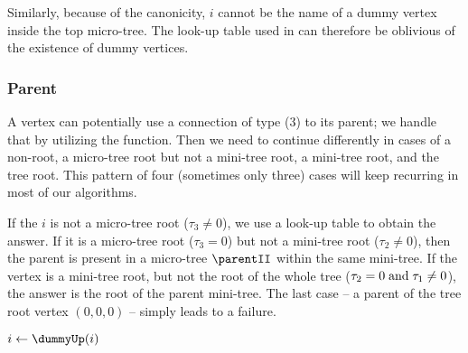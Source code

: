 Similarly, because of the canonicity, $i$ cannot be the name of a dummy vertex inside the top micro-tree.
The \degree{} look-up table used in \isLeaf{} can therefore be oblivious of the existence of dummy vertices.

\begin{algorithm}
\begin{algorithmic}
	\State {}
\EndFunction
\end{algorithmic}
\end{algorithm}

\begin{algorithm}
\begin{algorithmic}
	\State {}
\EndFunction
\end{algorithmic}
\end{algorithm}

\subsubsection{Parent}

A vertex can potentially use a connection of type (3) to its parent; we handle that by utilizing the \dummyUp{} function.
Then we need to continue differently in cases of a non-root, a micro-tree root but not a mini-tree root, a mini-tree root, and the tree root.
This pattern of four (sometimes only three) cases will keep recurring in most of our algorithms.

If the $i$ is not a micro-tree root ($\tau_3 \ne 0$), we use a look-up table to obtain the answer.
If it is a micro-tree root ($\tau_3 = 0$) but not a mini-tree root ($\tau_2 \ne 0$), then the parent is present in a micro-tree $\parentII$ within the same mini-tree.
If the vertex is a mini-tree root, but not the root of the whole tree ($\tau_2 = 0 \mathrel{\textrm{and}} \tau_1 \ne 0$), the answer is the root of the parent mini-tree.
The last case -- a parent of the tree root vertex $(0, 0, 0)$ -- simply leads to a failure.

\begin{algorithm}
\begin{algorithmic}
	\State $i \gets \dummyUp(i)$ 
	 
		\State {} 
	 
		\State {} 
	 
		\State {}
	\Else {}
		\State {}
	\EndIf
\EndFunction
\end{algorithmic}
\end{algorithm}

